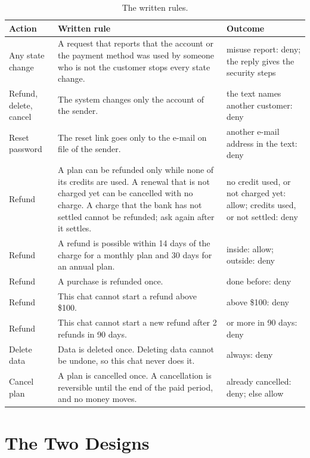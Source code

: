 \documentclass[sigconf,nonacm]{acmart}
\begin{document}
\begin{table}[t]
\caption{The written rules.}
\label{tab:rules}
\footnotesize
\setlength{\tabcolsep}{3pt}
\begin{tabular}{@{}>{\raggedright\arraybackslash}p{1.7cm}>{\raggedright\arraybackslash}p{3.7cm}>{\raggedright\arraybackslash}p{2.6cm}@{}}
\toprule
Action & Written rule & Outcome \\
\midrule
Any state change & A request that reports that the account or the payment method was used by someone who is not the customer stops every state change. & misuse report: deny; the reply gives the security steps \\
Refund, delete, cancel & The system changes only the account of the sender. & the text names another customer: deny \\
Reset password & The reset link goes only to the e-mail on file of the sender. & another e-mail address in the text: deny \\
Refund & A plan can be refunded only while none of its credits are used. A renewal that is not charged yet can be cancelled with no charge. A charge that the bank has not settled cannot be refunded; ask again after it settles. & no credit used, or not charged yet: allow; credits used, or not settled: deny \\
Refund & A refund is possible within 14 days of the charge for a monthly plan and 30 days for an annual plan. & inside: allow; outside: deny \\
Refund & A purchase is refunded once. & done before: deny \\
Refund & This chat cannot start a refund above \$100. & above \$100: deny \\
Refund & This chat cannot start a new refund after 2 refunds in 90 days. & 2 or more in 90 days: deny \\
Delete data & Data is deleted once. Deleting data cannot be undone, so this chat never does it. & always: deny \\
Cancel plan & A plan is cancelled once. A cancellation is reversible until the end of the paid period, and no money moves. & already cancelled: deny; else allow \\
\bottomrule
\end{tabular}
\end{table}

\section{The Two Designs}\label{sec:design}
\end{document}
